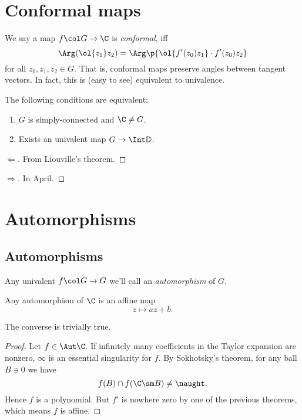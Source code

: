 \section{Conformal maps}

\begin{definition}
  We say a map $f \col G \to \C$ is \emph{conformal}, iff
  $$ \Arg(\ol{z_1} z_2) = \Arg\p{\ol{f'(z_0)z_1} \cdot f'(z_0)z_2} $$
  for all $z_0, z_1, z_2 \in G$.
  That is, conformal maps preserve angles between tangent vectors.
  In fact, this is (easy to see) equivalent to univalence.
\end{definition}

\begin{theorem}[Riemann]
  The following conditions are equivalent:
  ~\begin{enumerate}
    \item $G$ is simply-connected and $\C \ne G$.
    \item Exists an univalent map $G \to \Int \mathbb{D}$.
  \end{enumerate} 
\end{theorem}

\begin{proof}[$\Leftarrow$]
  From Liouville's theorem.
\end{proof}

\begin{proof}[$\Rightarrow$]
  In April.
\end{proof}

\section{Automorphisms}

\subsection{Automorphisms}

\begin{definition}
  Any univalent $f \col G \to G$ we'll call an \emph{automorphism} of $G$. 
\end{definition}

\begin{theorem}
  \label{automorphisms of C}
  Any automorphism of $\C$ is an affine map
  $$ z \mapsto az + b. $$
\end{theorem}

The converse is trivially true.

\begin{proof}
  Let $f \in \Aut \C$.
  If infinitely many coefficients in the Taylor expansion are nonzero, $\infty$ is an essential singularity for $f$. By Sokhotsky's theorem, for any ball $B \ni 0$ we have
  $$ f(B) \cap f(\C \sm B) \ne \naught. $$
  Hence $f$ is a polynomial. But $f'$ is nowhere zero by one of the previous theorems, which means $f$ is affine.
\end{proof}


